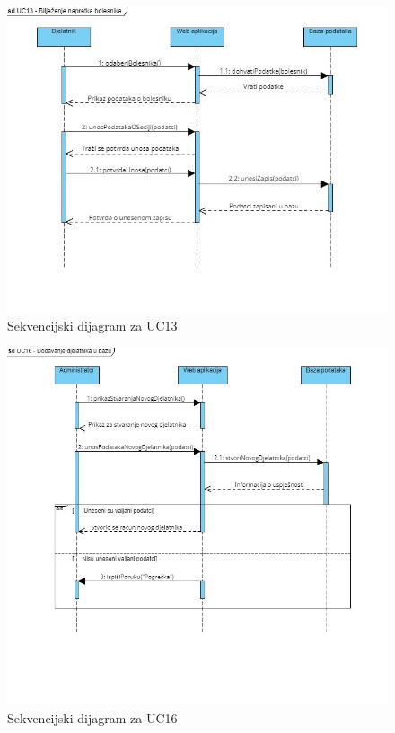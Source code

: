 \documentclass[12pt]{report}
\begin{document}
\begin{figure}[p]
    \centering
    \includegraphics[width=\textwidth]{./slike/Sekvencijski - UC13.jpg} 
    \caption{Sekvencijski dijagram za UC13}
    \label{fig:my_image}
\end{figure}
\eject
\begin{figure}[h]
    \centering
    \includegraphics[width=\textwidth]{./slike/Sekvencijski - UC16.jpg} 
    \caption{Sekvencijski dijagram za UC16}
    \label{fig:my_image}
\end{figure}
\eject
\end{document}
